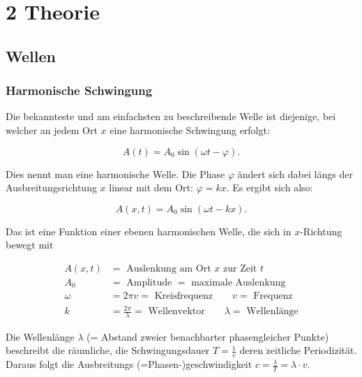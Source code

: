 \chapter*{2 Theorie}
\setcounter{chapter}{2}
\setcounter{section}{0}
\setcounter{subsection}{0}

\section{Wellen}


    \subsection{Harmonische Schwingung}

        Die bekannteste und am einfachsten zu beschreibende Welle ist diejenige, bei welcher an jedem Ort $x$ eine harmonische Schwingung erfolgt:

        $$A(t) = A_{0} \sin(\omega t - \varphi).$$

        Dies nennt man eine harmonische Welle. Die Phase $\varphi$ ändert sich dabei längs der Ausbreitungsrichtung $x$ linear mit dem Ort: $\varphi = kx$. Es ergibt sich also:

        $$A(x, t) = A_{0} \sin(\omega t - kx).$$

        Das ist eine Funktion einer ebenen harmonischen Welle, die sich in $x$-Richtung bewegt mit

        $$
        \begin{aligned}
        A(x, t) &= \text{ Auslenkung am Ort } x \text{ zur Zeit } t\\
        A_{0} &= \text{ Amplitude } = \text{ maximale Auslenkung}\\
        \omega &= 2 \pi v = \text{ Kreisfrequenz} \qquad v = \text{ Frequenz}\\
        k &= \frac{2 \pi}{\lambda} = \text{ Wellenvektor} \qquad \lambda = \text{ Wellenlänge}
        \end{aligned}
        $$

        Die Wellenlänge $\lambda$ (= Abstand zweier benachbarter phasengleicher Punkte) beschreibt die räumliche, die Schwingungsdauer $T = \frac{1}{v}$ deren zeitliche Periodizität. Daraus folgt die Ausbreitungs (=Phasen-)geschwindigkeit $c = \frac{\lambda}{T} = \lambda \cdot v$.


